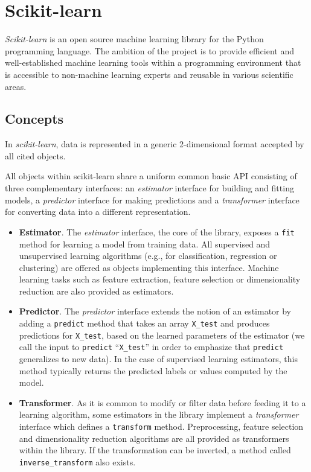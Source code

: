 \documentclass{frontiersSCNS} %
\newcounter{x}
\newcounter{y}
\newcounter{z}
\begin{document}
\section{Scikit-learn}
\label{scikitlearn}

{\em Scikit-learn} \citep{pedregosa2011} is an open source machine
learning library for the Python programming language. The ambition of the
project is to provide efficient and well-established machine learning tools within
a programming environment that is accessible to non-machine learning experts
and reusable in various scientific areas.

\subsection{Concepts}

In {\em scikit-learn}, data is represented in a generic 2-dimensional format
accepted by all cited objects.

All objects within scikit-learn share a uniform common basic API consisting of three
complementary interfaces: an \textit{estimator} interface for building and
fitting models, a \textit{predictor} interface for making predictions and a
\textit{transformer} interface for converting data into a different representation.

\begin{itemize}
\item {\bf Estimator}. The \textit{estimator} interface, the core of the
    library, exposes a \texttt{fit} method for learning a model from training data.
    All supervised
    and unsupervised learning algorithms (e.g., for classification, regression or
    clustering) are offered as objects implementing this interface. Machine
    learning tasks such as feature extraction, feature selection or dimensionality
    reduction are also provided as estimators.

\item {\bf Predictor}. The \textit{predictor} interface extends the notion of an estimator
    by adding a \texttt{predict}
    method that takes an array \texttt{X\_test} and produces
    predictions for \texttt{X\_test}, based on the learned parameters of the
    estimator (we call the input to \texttt{predict} ``\texttt{X\_test}'' in order
    to emphasize that \texttt{predict} generalizes to new data). In the case of
    supervised learning estimators, this method typically returns the predicted
    labels or values computed by the model.

\item {\bf Transformer}. As it is common to modify or filter data before feeding it to a learning
    algorithm, some estimators in the library implement a \textit{transformer}
    interface which defines a \texttt{transform} method. Preprocessing, feature selection and
    dimensionality reduction
    algorithms are all provided as transformers within the library. If the transformation
    can be inverted, a method called \verb!inverse_transform! also exists.

\end{itemize}
\end{document}

